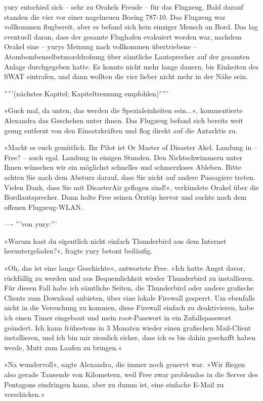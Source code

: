 yury entschied sich – sehr zu Orakels Freude – für das Flugzeug. Bald darauf standen die vier vor einer nagelneuen Boeing 787-10. Das Flugzeug war vollkommen flugbereit, aber es befand sich kein einziger Mensch an Bord. Das lag eventuell daran, dass der gesamte Flughafen evakuiert worden war, nachdem Orakel eine – yurys Meinung nach vollkommen übertriebene – Atombombenselbstmorddrohung über sämtliche Lautsprecher auf der gesamten Anlage durchgegeben hatte. Es konnte nicht mehr lange dauern, bis Einheiten des SWAT eintrafen, und dann wollten die vier lieber nicht mehr in der Nähe sein.


'''''(nächstes Kapitel; Kapiteltrennung empfohlen)'''''

»Guck mal, da unten, das werden die Spezialeinheiten sein...«, kommentierte Alexandra das Geschehen unter ihnen. Das Flugzeug befand sich bereits weit genug entfernt von den Einsatzkräften und flog direkt auf die Antarktis zu.

»Macht es euch gemütlich. Ihr Pilot ist Or Master of Disaster Akel. Landung in – Free? – auch egal. Landung in einigen Stunden. Den Nichtschwimmern unter Ihnen wünschen wir ein möglichst schnelles und schmerzloses Ableben. Bitte achten Sie nach dem Absturz darauf, dass Sie nicht auf andere Passagiere treten. Vielen Dank, dass Sie mit DisasterAir geflogen sind!«, verkündete Orakel über die Bordlautsprecher. Dann holte Free seinen Örztöp hervor und suchte nach dem offenen Flugzeug-WLAN.

----
'''von yury:'''

»Warum hast du eigentlich nicht einfach Thunderbird aus dem Internet heruntergeladen?«, fragte yury betont beiläufig.

»Oh, das ist eine lange Geschichte«, antwortete Free. »Ich hatte Angst davor, rückfällig zu werden und aus Bequemlichkeit wieder Thunderbird zu installieren. Für diesen Fall habe ich sämtliche Seiten, die Thunderbird oder andere grafische Clients zum Download anbieten, über eine lokale Firewall gesperrt. Um ebenfalls nicht in die Versuchung zu kommen, diese Firewall einfach zu deaktivieren, habe ich einen Timer eingebaut und mein root-Passwort in ein Zufallspasswort geändert. Ich kann frühestens in 3 Monaten wieder einen grafischen Mail-Client installieren, und ich bin mir ziemlich sicher, dass ich es bis dahin geschafft haben werde, Mutt zum Laufen zu bringen.«

»Na wundervoll«, sagte Alexandra, die immer noch genervt war. »Wir fliegen also gerade Tausende von Kilometern, weil Free zwar problemlos in die Server des Pentagons eindringen kann, aber zu dumm ist, eine einfache E-Mail zu verschicken.«

